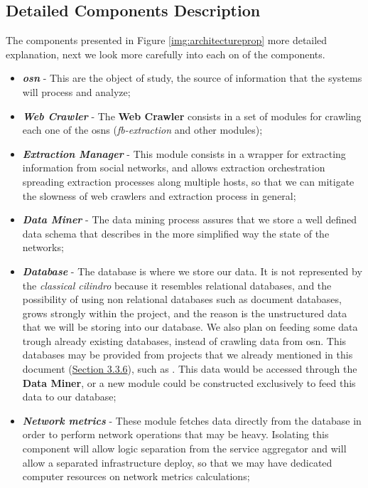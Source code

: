 \subsection{Detailed Components Description}
The components presented in Figure \ref{img:architectureprop} more detailed explanation, next we look more carefully into each on of the components.
\begin{itemize}
    \item \textbf{\textit{\acrfull{osn}}} - This are the object of study, the source of information that the systems will process and analyze;
    \item \textbf{\textit{Web Crawler}} - The \textbf{Web Crawler} consists in a set of modules for crawling each one of the \glspl{osn} (\textit{fb-extraction} and other modules);
    \item \textbf{\textit{Extraction Manager}} - This module consists in a wrapper for extracting information from social networks, and allows extraction orchestration spreading extraction processes along multiple hosts, so that we can mitigate the slowness of web crawlers and extraction process in general;
    \item \textbf{\textit{Data Miner}} - The data mining process assures that we store a well defined data schema that describes in the more simplified way the state of the networks;
    \item \textbf{\textit{Database}} - The database is where we store our data. It is not represented by the \textit{classical cilindro} because it resembles relational databases, and the possibility of using non relational databases such as document databases, grows strongly within the project, and the reason is the unstructured data that we will be storing into our database. We also plan on feeding some data trough already existing databases, instead of crawling data from \gls{osn}. This databases may be provided from projects that we already mentioned in this document  (\hyperref[sec:otherdatasources]{Section 3.3.6}), such as \cite{kunegis2013konect}. This data would be accessed through the \textbf{Data Miner}, or a new module could be constructed exclusively to feed this data to our database;
    \item \textbf{\textit{Network metrics}} - These module fetches data directly from the database in order to perform network operations that may be heavy. Isolating this component will allow logic separation from the service aggregator and will allow a separated infrastructure deploy, so that we may have dedicated computer resources on network metrics calculations;

\end{itemize}
